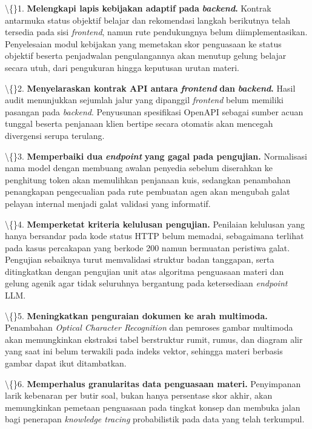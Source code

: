 \documentclass[12pt,a4paper]{article}
\begin{document}
\textbackslash\{\}1. \textbf{Melengkapi lapis kebijakan adaptif pada} \textbf{\textit{backend}\textbf{}.} Kontrak antarmuka status objektif belajar dan rekomendasi langkah berikutnya telah tersedia pada sisi \textit{frontend}, namun rute pendukungnya belum diimplementasikan. Penyelesaian modul kebijakan yang memetakan skor penguasaan ke status objektif beserta penjadwalan pengulangannya akan menutup gelung belajar secara utuh, dari pengukuran hingga keputusan urutan materi.

\textbackslash\{\}2. \textbf{Menyelaraskan kontrak API antara} \textbf{\textit{frontend}} \textbf{dan} \textbf{\textit{backend}\textbf{}.} Hasil audit menunjukkan sejumlah jalur yang dipanggil \textit{frontend} belum memiliki pasangan pada \textit{backend}. Penyusunan spesifikasi OpenAPI sebagai sumber acuan tunggal beserta penjanaan klien bertipe secara otomatis akan mencegah divergensi serupa terulang.

\textbackslash\{\}3. \textbf{Memperbaiki dua} \textbf{\textit{endpoint}} \textbf{yang gagal pada pengujian.} Normalisasi nama model dengan membuang awalan penyedia sebelum diserahkan ke penghitung token akan memulihkan penjanaan kuis, sedangkan penambahan penangkapan pengecualian pada rute pembuatan agen akan mengubah galat pelayan internal menjadi galat validasi yang informatif.

\textbackslash\{\}4. \textbf{Memperketat kriteria kelulusan pengujian.} Penilaian kelulusan yang hanya bersandar pada kode status HTTP belum memadai, sebagaimana terlihat pada kasus percakapan yang berkode 200 namun bermuatan peristiwa galat. Pengujian sebaiknya turut memvalidasi struktur badan tanggapan, serta ditingkatkan dengan pengujian unit atas algoritma penguasaan materi dan gelung agenik agar tidak seluruhnya bergantung pada ketersediaan \textit{endpoint} LLM.

\textbackslash\{\}5. \textbf{Meningkatkan penguraian dokumen ke arah multimoda.} Penambahan \textit{Optical Character Recognition} dan pemroses gambar multimoda akan memungkinkan ekstraksi tabel berstruktur rumit, rumus, dan diagram alir yang saat ini belum terwakili pada indeks vektor, sehingga materi berbasis gambar dapat ikut ditambatkan.

\textbackslash\{\}6. \textbf{Memperhalus granularitas data penguasaan materi.} Penyimpanan larik kebenaran per butir soal, bukan hanya persentase skor akhir, akan memungkinkan pemetaan penguasaan pada tingkat konsep dan membuka jalan bagi penerapan \textit{knowledge tracing} probabilistik pada data yang telah terkumpul.
\end{document}

